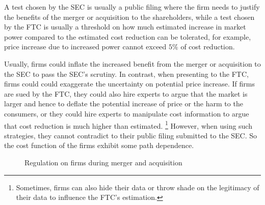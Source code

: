 A test chosen by the SEC is usually a public filing where the firm needs to justify the benefits of the merger or acquisition to the shareholders,
while a test chosen by the FTC is usually a threshold on how much estimated increase in market power  compared to the estimated  cost reduction can be tolerated, for example, price increase due to increased power cannot exceed $5\%$ of cost reduction.
 
Usually, firms could inflate the increased benefit from the merger or acquisition to the SEC to pass the SEC's scrutiny.
In contrast, when presenting to the FTC, firms could 
could exaggerate the uncertainty on potential price increase.
If firms are sued by the FTC, they could also hire experts to argue that the market is larger and hence  to deflate the potential increase of price or the harm to the consumers, or they could hire experts to manipulate cost information to argue that cost reduction is much higher than estimated. \footnote{Sometimes, firms can also hide their data or throw shade on the legitimacy of their data to influence the FTC's estimation.}
However, when using such strategies, they cannot contradict to their public filing submitted to the SEC. So the cost function of the firms exhibit some path dependence. 


\begin{figure}[h] 
\centering 
{}
\caption{Regulation on firms during merger and acquisition}
\label{fig: FTC-SEC}
  \end{figure}



